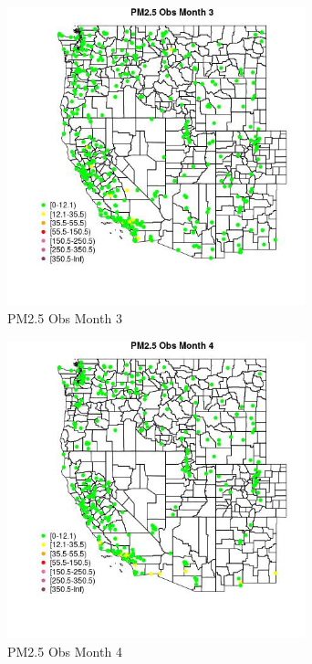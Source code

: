 \begin{figure} 
\centering  
\includegraphics[width=0.77\textwidth]{Code_Outputs/Report_ML_input_PM25_Step4_part_e_de_duplicated_aves_compiled_2019-05-18wNAs_MapObsMo3PM25_Obs.jpg} 
\caption{\label{fig:Report_ML_input_PM25_Step4_part_e_de_duplicated_aves_compiled_2019-05-18wNAsMapObsMo3PM25_Obs}PM2.5 Obs Month 3} 
\end{figure} 
 

\begin{figure} 
\centering  
\includegraphics[width=0.77\textwidth]{Code_Outputs/Report_ML_input_PM25_Step4_part_e_de_duplicated_aves_compiled_2019-05-18wNAs_MapObsMo4PM25_Obs.jpg} 
\caption{\label{fig:Report_ML_input_PM25_Step4_part_e_de_duplicated_aves_compiled_2019-05-18wNAsMapObsMo4PM25_Obs}PM2.5 Obs Month 4} 
\end{figure} 
 


